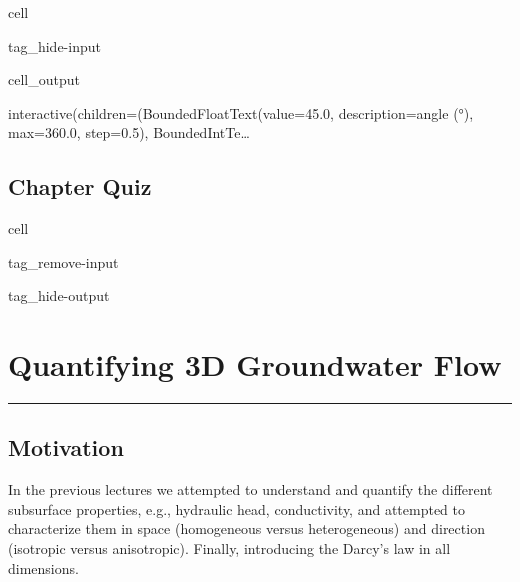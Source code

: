 \documentclass[letterpaper,10pt,english]{jupyterBook}
\begin{document}
\begin{sphinxuseclass}{cell}
\begin{sphinxuseclass}{tag_hide-input}\begin{sphinxVerbatimOutput}

\begin{sphinxuseclass}{cell_output}
\begin{sphinxVerbatim}[commandchars=\\\{\}]
interactive(children=(BoundedFloatText(value=45.0, description=\PYGZsq{}angle (°)\PYGZsq{}, max=360.0, step=0.5), BoundedIntTe…
\end{sphinxVerbatim}

\end{sphinxuseclass}\end{sphinxVerbatimOutput}

\end{sphinxuseclass}
\end{sphinxuseclass}

\section{Chapter Quiz}
\label{\detokenize{content/flow/L6/16_darcy_law_3D:chapter-quiz}}
\begin{sphinxuseclass}{cell}
\begin{sphinxuseclass}{tag_remove-input}
\begin{sphinxuseclass}{tag_hide-output}
\end{sphinxuseclass}
\end{sphinxuseclass}
\end{sphinxuseclass}
\sphinxstepscope


\chapter{Quantifying 3D Groundwater Flow}
\label{\detokenize{content/flow/L7/17_quantify_flow:quantifying-3d-groundwater-flow}}\label{\detokenize{content/flow/L7/17_quantify_flow::doc}}
\sphinxAtStartPar
{}


\bigskip\hrule\bigskip



\section{Motivation}
\label{\detokenize{content/flow/L7/17_quantify_flow:motivation}}
\sphinxAtStartPar
In the previous lectures we attempted to understand and quantify the different sub\sphinxhyphen{}surface properties, e.g., hydraulic head, conductivity, and attempted to characterize them in space (homogeneous versus heterogeneous) and direction (isotropic versus anisotropic). Finally, introducing the Darcy’s law in all dimensions.
\end{document}
